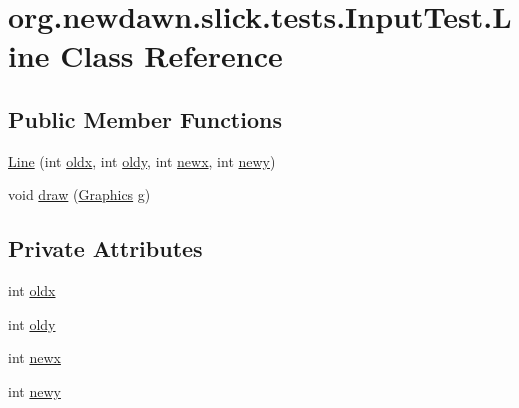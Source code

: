 \hypertarget{classorg_1_1newdawn_1_1slick_1_1tests_1_1_input_test_1_1_line}{}\section{org.\+newdawn.\+slick.\+tests.\+Input\+Test.\+Line Class Reference}
\label{classorg_1_1newdawn_1_1slick_1_1tests_1_1_input_test_1_1_line}
\subsection*{Public Member Functions}
\begin{DoxyCompactItemize}
\item 
\mbox{\hyperlink{classorg_1_1newdawn_1_1slick_1_1tests_1_1_input_test_1_1_line_a8629383df1a8eb18f381834907531e46}{Line}} (int \mbox{\hyperlink{classorg_1_1newdawn_1_1slick_1_1tests_1_1_input_test_1_1_line_a7c4b8907da6261784c6f61ad8379cbc3}{oldx}}, int \mbox{\hyperlink{classorg_1_1newdawn_1_1slick_1_1tests_1_1_input_test_1_1_line_a7349c6da68a0a57fe7687f10c0af912f}{oldy}}, int \mbox{\hyperlink{classorg_1_1newdawn_1_1slick_1_1tests_1_1_input_test_1_1_line_ab23fd0b59d5b413dc26c0c86a5f62ba3}{newx}}, int \mbox{\hyperlink{classorg_1_1newdawn_1_1slick_1_1tests_1_1_input_test_1_1_line_ada907433d8d222da630e7aabf5f77206}{newy}})
\item 
void \mbox{\hyperlink{classorg_1_1newdawn_1_1slick_1_1tests_1_1_input_test_1_1_line_aba1ebddf15932f0bb1e2441d1bddb271}{draw}} (\mbox{\hyperlink{classorg_1_1newdawn_1_1slick_1_1_graphics}{Graphics}} g)
\end{DoxyCompactItemize}
\subsection*{Private Attributes}
\begin{DoxyCompactItemize}
\item 
int \mbox{\hyperlink{classorg_1_1newdawn_1_1slick_1_1tests_1_1_input_test_1_1_line_a7c4b8907da6261784c6f61ad8379cbc3}{oldx}}
\item 
int \mbox{\hyperlink{classorg_1_1newdawn_1_1slick_1_1tests_1_1_input_test_1_1_line_a7349c6da68a0a57fe7687f10c0af912f}{oldy}}
\item 
int \mbox{\hyperlink{classorg_1_1newdawn_1_1slick_1_1tests_1_1_input_test_1_1_line_ab23fd0b59d5b413dc26c0c86a5f62ba3}{newx}}
\item 
int \mbox{\hyperlink{classorg_1_1newdawn_1_1slick_1_1tests_1_1_input_test_1_1_line_ada907433d8d222da630e7aabf5f77206}{newy}}
\end{DoxyCompactItemize}


